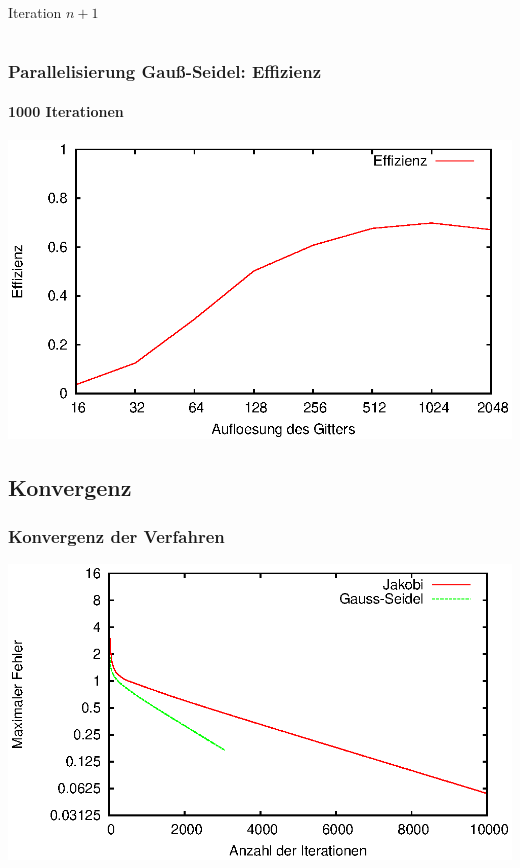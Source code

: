 \documentclass{beamer}
\begin{document}
\begin{frame}
\begin{columns}
\begin{column}{0.5\textwidth}
            \begin{center}
                Iteration $n+1$
            \end{center}
        \end{column}
    \end{columns}
\end{frame}

\begin{frame}
    \frametitle{Parallelisierung Gauß-Seidel: Effizienz}
    \framesubtitle{1000 Iterationen}
    \includegraphics[width=\textwidth]{plots/effizienzgaussseidel}
\end{frame}

\subsection{Konvergenz}
\begin{frame}
    \frametitle{Konvergenz der Verfahren}
    \includegraphics[width=\textwidth]{plots/fehlerpres}
\end{frame}
\end{document}

